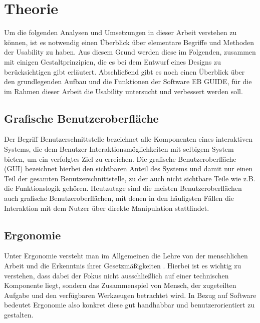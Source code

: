 \chapter{Theorie}\label{ch:data}
Um die folgenden Analysen und Umsetzungen in dieser Arbeit verstehen zu können, ist es notwendig einen Überblick über elementare Begriffe und Methoden der Usability zu haben.
Aus diesem Grund werden diese im Folgenden, zusammen mit einigen Gestaltprinzipien, die es bei dem Entwurf eines Designs zu berücksichtigen gibt erläutert.
Abschließend gibt es noch einen Überblick über den grundlegenden Aufbau und die Funktionen der Software EB GUIDE, für die im Rahmen dieser Arbeit die Usability untersucht und verbessert werden soll.

\section{Grafische Benutzeroberfläche}
Der Begriff Benutzerschnittstelle bezeichnet alle Komponenten eines interaktiven Systems, die dem Benutzer Interaktionsmöglichkeiten mit selbigem System bieten, um ein verfolgtes Ziel zu erreichen.
Die grafische Benutzeroberfläche (GUI) bezeichnet hierbei den sichtbaren Anteil des Systems und damit nur einen Teil der gesamten Benutzerschnittstelle, zu der auch nicht sichtbare Teile wie z.B. die Funktionslogik gehören\cite{Sarodnick.2016}.
Heutzutage sind die meisten Benutzeroberflächen auch grafische Benutzeroberflächen, mit denen in den häufigsten Fällen die Interaktion mit dem Nutzer über direkte Manipulation stattfindet\cite{Nielsen.1995?}.

\section{Ergonomie}
Unter Ergonomie versteht man im Allgemeinen die \glqq Lehre von der menschlichen Arbeit und die Erkenntnis ihrer Gesetzmäßigkeiten\grqq{} \cite{Bullinger.1994}.
Hierbei ist es wichtig zu verstehen, dass dabei der Fokus nicht ausschließlich auf einer technischen Komponente liegt, sondern das Zusammenspiel von Mensch, der zugeteilten Aufgabe und den verfügbaren Werkzeugen betrachtet wird\cite{Sarodnick.2016}.
In Bezug auf Software bedeutet Ergonomie also konkret diese gut handhabbar und benutzerorientiert zu gestalten.


